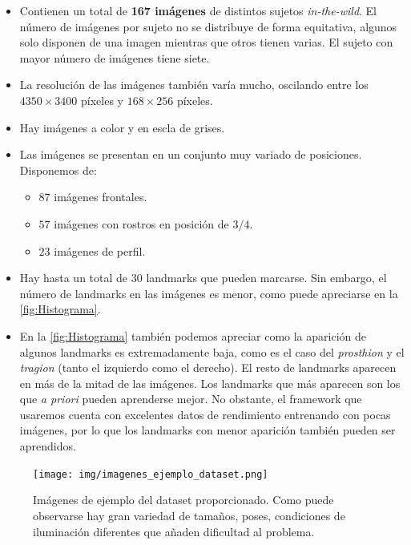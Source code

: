         \begin{itemize}
            \item Contienen un total de \textbf{167 imágenes} de distintos sujetos \textit{in-the-wild}. El número de imágenes por sujeto no se distribuye de forma equitativa, algunos solo disponen de una imagen mientras que otros tienen varias. El sujeto con mayor número de imágenes tiene siete.
            \item La resolución de las imágenes también varía mucho, oscilando entre los $4350 \times 3400$ píxeles y $168 \times 256$ píxeles.
            \item Hay imágenes a color y en escla de grises.
            \item Las imágenes se presentan en un conjunto muy variado de posiciones. Disponemos de: 
            \begin{itemize}
                \item $87$ imágenes frontales.
                \item $57$ imágenes con rostros en posición de \textbf{$3/4$}.
                \item $23$ imágenes de perfil.
            \end{itemize}
            \item Hay hasta un total de $30$ landmarks que pueden marcarse. Sin embargo, el número de landmarks en las imágenes es menor, como puede apreciarse en la \autoref{fig:Histograma}.
            \item En la \autoref{fig:Histograma} también podemos apreciar como la aparición de algunos landmarks es extremadamente baja, como es el caso del \textit{prosthion} y el \textit{tragion} (tanto el izquierdo como el derecho). El resto de landmarks aparecen en más de la mitad de las imágenes. Los landmarks que más aparecen son los que \textit{a priori} pueden aprenderse mejor. No obstante, el framework que usaremos cuenta con excelentes datos de rendimiento entrenando con pocas imágenes, por lo que los landmarks con menor aparición también pueden ser aprendidos.
        \end{itemize}
            \begin{figure}[h]
                \centering
                \texttt{[image: img/imagenes\_ejemplo\_dataset.png]}
                \caption{Imágenes de ejemplo del dataset proporcionado. Como puede observarse hay gran variedad de tamaños, poses, condiciones de iluminación diferentes que añaden dificultad al problema.}
                \label{fig:Imagenes_dataset}
            \end{figure}

